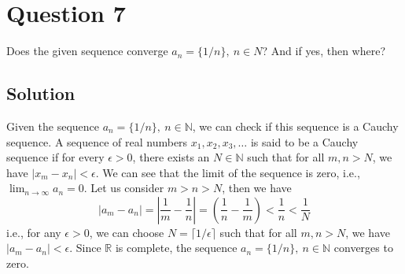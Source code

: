 \section*{Question 7}

Does the given sequence converge \( a_{n} = \{1 / n\}, \ n \in N \)?
And if yes, then where?

\subsection*{Solution}

Given the sequence \( a_{n} = \{1 / n\}, \ n \in \mathbb{N} \), we can check if this sequence is a Cauchy sequence.
A sequence of real numbers \( x_1, x_2, x_3, \dots \) is said to be a Cauchy sequence if for every \( \epsilon > 0 \), there exists an \( N \in \mathbb{N} \) such that for all \( m, n > N \), we have \( \vert x_m - x_n \vert < \epsilon \).
We can see that the limit of the sequence is zero, i.e., \( \lim_{n \to \infty} a_n = 0 \).
Let us consider \( m > n > N \), then we have
\[
    \vert a_m - a_n \vert
    = \left\vert \frac{1}{m} - \frac{1}{n} \right\vert
    = \left( \frac{1}{n} - \frac{1}{m} \right)
    < \frac{1}{n}
    < \frac{1}{N}
\]
i.e., for any \( \epsilon > 0 \), we can choose \( N = \lceil 1/\epsilon \rceil \) such that for all \( m, n > N \), we have \( \vert a_m - a_n \vert < \epsilon \).
Since \( \mathbb{R} \) is complete, the sequence \( a_n = \{1 / n\}, \ n \in \mathbb{N} \) converges to zero.

